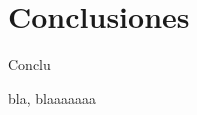  \section{Conclusiones}
	
\begin{frame}{Conclu}
	\begin{block}{}
	bla, blaaaaaaa
	\end{block}
\end{frame}